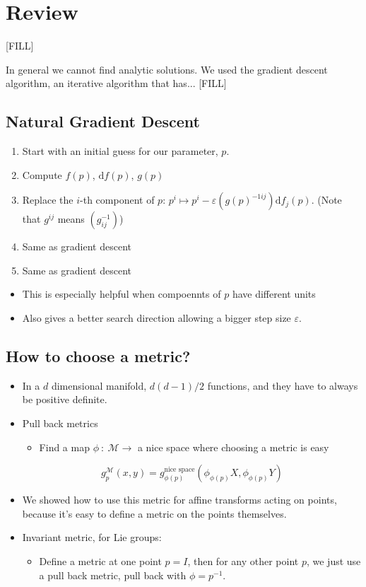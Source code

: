 \documentclass[10pt]{article}
\newcommand{\dd}{\text{d}}
\begin{document}
\section*{Review}
[FILL]

In general we cannot find analytic solutions.  We used the gradient descent algorithm, an iterative algorithm that has... [FILL]

\subsection*{Natural Gradient Descent}
\begin{enumerate}
    \item Start with an initial guess for our parameter, $p$.
    \item Compute $f(p)$, $\dd f(p)$, $g(p)$
    \item Replace the $i$-th component of $p$:  $p^i \mapsto p^i - \varepsilon(g(p)^{-1ij}) \dd f_j(p)$.  (Note that $g^{ij}$ means $(g^{-1}_{ij})$)
    \item Same as gradient descent
    \item Same as gradient descent
\end{enumerate}
\begin{itemize}
	\item This is especially helpful when compoennts of $p$ have different units
    \item Also gives a better search direction allowing a bigger step size $\varepsilon$.
\end{itemize}

\subsection*{How to choose a metric?}
\begin{itemize}
	\item In a $d$ dimensional manifold, $d(d - 1)/2$ functions, and they have to always be positive definite.
	\item Pull back metrics
	\begin{itemize}
        \item Find a map $\phi \::\: \mathcal{M} \rightarrow$ a nice space where choosing a metric is easy
    \end{itemize}
    \[g_p^{\mathcal{M}}(x, y) = g_{\phi(p)}^{\text{nice space}} (\phi_{\phi(p)}X, \phi_{\phi(p)}Y)\]
    \item We showed how to use this metric for affine transforms acting on points, because it's easy to define a metric on the points themselves.
    \item Invariant metric, for Lie groups:
    \begin{itemize}
        \item Define a metric at one point $p = I$, then for any other point $p$, we just use a pull back metric, pull back with $\phi = p^{-1}$.
    \end{itemize}
\end{itemize}
\end{document}
